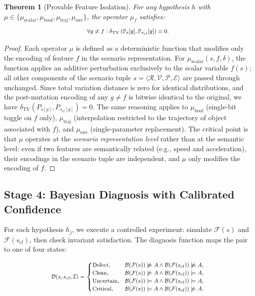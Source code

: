 \documentclass[journal]{IEEEtran}
\theoremstyle{plain}
\newtheorem{theorem}{Theorem}[section]
\newcommand{\fwleq}[1]{\begin{equation}\medmath{#1}\end{equation}}
\newcommand{\sys}{\mathcal{F}}
\newcommand{\beh}{\mathcal{B}}
\newcommand{\diag}{\mathcal{D}}
\newcommand{\Prob}{\mathbb{P}}
\newcommand{\TV}[2]{\delta_{\mathrm{TV}}\left(#1,#2\right)}
\begin{document}
\begin{theorem}[Provable Feature Isolation]\label{thm:isolation}
For any hypothesis $h$ with $\mu \in \{\mu_{\text{scalar}},\mu_{\text{bool}},\mu_{\text{traj}},\mu_{\text{env}}\}$, the operator $\mu_f$ satisfies:
\fwleq{\forall g \neq f: \TV{\Prob_{s}[g]}{\Prob_{s_{\text{cf}}}[g]} = 0.}
\end{theorem}

\begin{proof}
Each operator $\mu$ is defined as a deterministic function that modifies only the encoding of feature $f$ in the scenario representation. For $\mu_{\text{scalar}}(s,f,\delta)$, the function applies an additive perturbation exclusively to the scalar variable $f(s)$; all other components of the scenario tuple $s = \langle \mathcal{R}, \mathcal{V}, \mathcal{P}, \mathcal{E} \rangle$ are passed through unchanged. Since total variation distance is zero for identical distributions, and the post-mutation encoding of any $g \neq f$ is bitwise identical to the original, we have $\TV{P_{s[g]}}{P_{s_{\text{cf}}[g]}} = 0$. The same reasoning applies to $\mu_{\text{bool}}$ (single-bit toggle on $f$ only), $\mu_{\text{traj}}$ (interpolation restricted to the trajectory of object associated with $f$), and $\mu_{\text{env}}$ (single-parameter replacement). The critical point is that $\mu$ operates at the \emph{scenario representation level} rather than at the semantic level: even if two features are semantically related (e.g., speed and acceleration), their encodings in the scenario tuple are independent, and $\mu$ only modifies the encoding of $f$.
\end{proof}

\subsection{Stage 4: Bayesian Diagnosis with Calibrated Confidence}

For each hypothesis $h_j$, we execute a controlled experiment: simulate $\sys(s)$ and $\sys(s_{\text{cf}})$, then check invariant satisfaction. The diagnosis function maps the pair to one of four states:

\fwleq{\diag(s, s_{\text{cf}}, \mathcal{I}) = \begin{cases}
\text{Defect}, & \beh(\sys(s)) \not\models A \land \beh(\sys(s_{\text{cf}})) \not\models A, \\
\text{Clean}, & \beh(\sys(s)) \not\models A \land \beh(\sys(s_{\text{cf}})) \models A, \\
\text{Uncertain}, & \beh(\sys(s)) \models A \land \beh(\sys(s_{\text{cf}})) \models A, \\
\text{Critical}, & \beh(\sys(s)) \models A \land \beh(\sys(s_{\text{cf}})) \not\models A.
\end{cases}}
\end{document}
